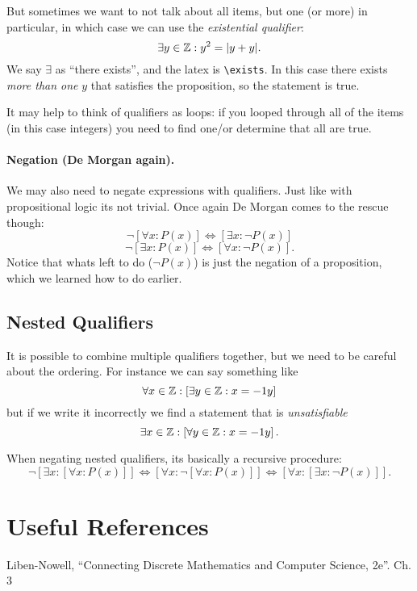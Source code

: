 \documentclass[11pt, oneside]{article}   	%
\begin{document}
But sometimes we want to not talk about all items, but one (or more) in particular, in which case we can use the \emph{existential qualifier}:
\[\exists y\in\operatorname{\mathbb{Z}}: y^2 = |y+y|.\]
We say $\exists$ as ``there exists'', and the latex is \texttt{\textbackslash{}exists}. 
In this case there exists \textit{more than one} $y$ that satisfies the proposition, so the statement is true.

It may help to think of qualifiers as loops: 
if you looped through all of the items (in this case integers) you need to find one/or determine that all are true. 

\paragraph{Negation (De Morgan again).}
 We may also need to negate expressions with qualifiers. 
 Just like with propositional logic its not trivial. 
 Once again De Morgan comes to the rescue though: 
 \[\neg \left[\forall x : P(x)\right] \iff \left[\exists x : \neg P(x)\right]\]
 \[\neg \left[\exists x : P(x)\right] \iff \left[\forall x : \neg P(x)\right].\]
 Notice that whats left to do ($\neg P(x)$) is just the negation of a proposition, which we learned how to do earlier. 

 \subsection{Nested Qualifiers}
 It is possible to combine multiple qualifiers together, but we need to be careful about the ordering. 
 For instance we can say something like 
 \[
 \forall x \in \operatorname{\mathbb{Z}} : \left[\exists y \in \operatorname{\mathbb{Z}} : x = -1 y\right]
 \]
 but if we write it incorrectly we find a statement that is \emph{unsatisfiable}
  \[
 \exists x \in \operatorname{\mathbb{Z}} : \left[\forall y \in \operatorname{\mathbb{Z}} : x = -1 y\right].
 \]
 
 When negating nested qualifiers, its basically a recursive procedure: 
  \[\neg \left[\exists x : \left[ \forall x: P(x)\right]\right] \iff \left[\forall x : \neg\left[ \forall x: P(x)\right]\right] \iff \left[\forall x : \left[ \exists x: \neg P(x)\right]\right].\]
  
\section*{Useful References}
Liben-Nowell, ``Connecting Discrete Mathematics and Computer Science, 2e''. Ch. 3 
\end{document}
